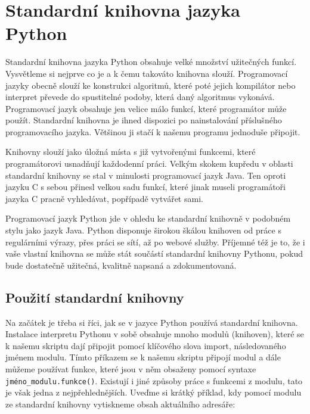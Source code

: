 \chapter{Standardní knihovna jazyka Python}

Standardní knihovna jazyka Python obsahuje velké množství užitečných funkcí. Vysvětleme si nejprve co je a k čemu takováto knihovna slouží. Programovací jazyky obecně slouží ke konstrukci algoritmů, které poté jejich kompilátor nebo interpret převede do spustitelné podoby, která daný algoritmus vykonává. Programovací jazyk obsahuje jen velice málo funkcí, které programátor může použít. Standardní knihovna je ihned dispozici po nainstalování příslušného programovacího jazyka. Většinou ji stačí k našemu programu jednoduše připojit.

Knihovny slouží jako úložná místa s již vytvořenými funkcemi, které programátorovi usnadňují každodenní práci. Velkým skokem kupředu v oblasti standardní knihovny se stal v minulosti programovací jazyk Java. Ten oproti jazyku C s sebou přinesl velkou sadu funkcí, které jinak museli programátoři jazyka C pracně vyhledávat, popřípadě vytvářet sami.

Programovací jazyk Python jde v ohledu ke standardní knihovně v podobném stylu jako jazyk Java. Python disponuje širokou škálou knihoven od práce s regulárními výrazy, přes práci se sítí, až po webové služby. Příjemné též je to, že i vaše vlastní knihovna se může stát součástí standardní knihovny Pythonu, pokud bude dostatečně užitečná, kvalitně napsaná a zdokumentovaná.



\section{Použití standardní knihovny}
Na začátek je třeba si říci, jak se v jazyce Python používá standardní kni\-ho\-vna. Instalace interpretu Pythonu v sobě obsahuje mnoho modulů (knihoven), které se k našemu skriptu dají připojit pomocí klíčového slova import, následovaného jménem modulu. Tímto příkazem se k našemu skriptu připojí modul a dále můžeme používat funkce, které jsou v něm obsaženy pomocí syntaxe \texttt{jméno\_modulu.funkce()}. Existují i jiné způsoby práce s funkcemi z modulu, tato je však jedna z nejpřehlednějších. Uveďme si krátký příklad, kdy pomocí modulu  ze standardní knihovny vytiskneme obsah aktuálního adresáře:

